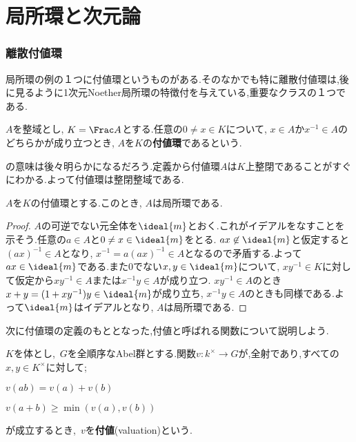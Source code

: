 \newpage
\part[Local ring and Dimension theory]{局所環と次元論}

\section{離散付値環}

局所環の例の１つに付値環というものがある.そのなかでも特に離散付値環は,後に見るように1次元Noether局所環の特徴付を与えている,重要なクラスの１つである.

\begin{defi}[付値環]
	$A$を整域とし, $K=\Frac A$とする.任意の$0\neq x\in K$について, $x\in A$か$x^{-1}\in A$のどちらかが成り立つとき, $A$を$K$の\textbf{付値環}であるという.
\end{defi}

の意味は後々明らかになるだろう.定義から付値環$A$は$K$上整閉であることがすぐにわかる.よって付値環は整閉整域である.

\begin{prop}
	$A$を$K$の付値環とする.このとき, $A$は局所環である.
\end{prop}

\begin{proof}
	$A$の可逆でない元全体を$\ideal{m}$とおく.これがイデアルをなすことを示そう.任意の$a\in A$と$0\neq x\in\ideal{m}$をとる. $ax\not\in\ideal{m}$と仮定すると$(ax)^{-1}\in A$となり, $x^{-1}=a(ax)^{-1}\in A$となるので矛盾する.よって$ax\in \ideal{m}$である.また$0$でない$x,y\in\ideal{m}$について, $xy^{-1}\in K$に対して仮定から$xy^{-1}\in A$または$x^{-1}y\in A$が成り立つ. $xy^{-1}\in A$のとき$x+y=(1+xy^{-1})y\in \ideal{m}$が成り立ち, $x^{-1}y\in A$のときも同様である.よって$\ideal{m}$はイデアルとなり, $A$は局所環である.
\end{proof}

次に付値環の定義のもととなった,付値と呼ばれる関数について説明しよう.

\begin{defi}[付値]
	$K$を体とし,~$G$を全順序なAbel群とする.関数$v:k^\times\to G$が,全射であり,すべての$x,y\in K^\times$に対して;
	\begin{sakura}
		\item $v(ab)=v(a)+v(b)$
		\item $v(a+b)\geq\min (v(a),v(b))$
	\end{sakura}
	が成立するとき,~$v$を\textbf{付値}(valuation)という.
\end{defi}

